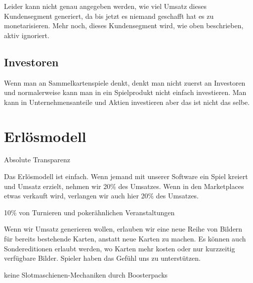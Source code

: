 \documentclass[fontsize=12, a4aper]{scrartcl}
\begin{document}
\noindent Leider kann nicht genau angegeben werden, wie viel Umsatz dieses Kundensegment generiert, da bis jetzt es niemand geschafft hat es zu monetarisieren. Mehr noch, dieses Kundensegment wird, wie oben beschrieben, aktiv ignoriert.


\subsection{Investoren} \label{subsec:Investoren}

Wenn man an Sammelkartenspiele denkt, denkt man nicht zuerst an Investoren und normalerweise kann man in ein Spielprodukt nicht einfach investieren. Man kann in Unternehmensanteile und Aktien investieren aber das ist nicht das selbe.

\section{Erlösmodell} \label{sec:Erloesmodell}

Absolute Transparenz

Das Erlösmodell ist einfach. Wenn jemand mit unserer Software ein Spiel kreiert und Umsatz erzielt, nehmen wir 20\% des Umsatzes. Wenn in den Marketplaces etwas verkauft wird, verlangen wir auch hier 20\% des Umsatzes. 

10\% von Turnieren und pokerähnlichen Veranstaltungen

Wenn wir Umsatz generieren wollen, erlauben wir eine neue Reihe von Bildern für bereits bestehende Karten, anstatt neue Karten zu machen. Es können auch Sondereditionen erlaubt werden, wo Karten mehr kosten oder nur kurzzeitig verfügbare Bilder. Spieler haben das Gefühl uns zu unterstützen.

keine Slotmaschienen-Mechaniken durch Boosterpacks




\newpage

\listoftables

\listoffigures

\newpage

\appendix


\end{document}
